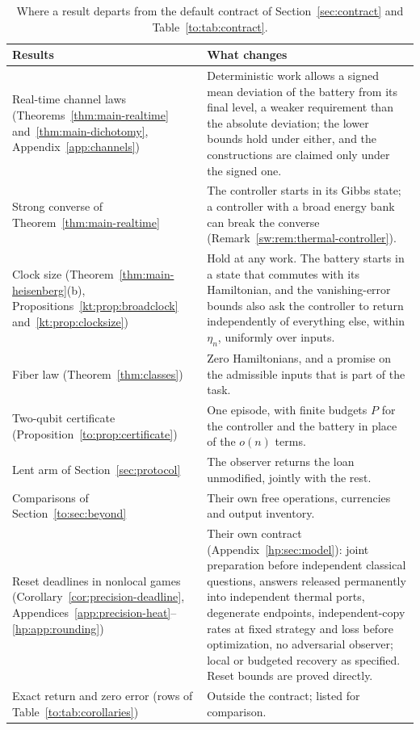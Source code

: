 \begin{table}[tbp]
\centering
\small
\begin{tabular}{@{}>{\raggedright\arraybackslash}p{4.6cm}>{\raggedright\arraybackslash}p{10.2cm}@{}}
\toprule
Results & What changes\\
\midrule
Real-time channel laws (Theorems~\ref{thm:main-realtime} and~\ref{thm:main-dichotomy}, Appendix~\ref{app:channels}) & Deterministic work allows a signed mean deviation of the battery from its final level, a weaker requirement than the absolute deviation; the lower bounds hold under either, and the constructions are claimed only under the signed one.\\
Strong converse of Theorem~\ref{thm:main-realtime} & The controller starts in its Gibbs state; a controller with a broad energy bank can break the converse (Remark~\ref{sw:rem:thermal-controller}).\\
Clock size (Theorem~\ref{thm:main-heisenberg}(b), Propositions~\ref{kt:prop:broadclock} and~\ref{kt:prop:clocksize}) & Hold at any work. The battery starts in a state that commutes with its Hamiltonian, and the vanishing-error bounds also ask the controller to return independently of everything else, within $\eta_n$, uniformly over inputs.\\
Fiber law (Theorem~\ref{thm:classes}) & Zero Hamiltonians, and a promise on the admissible inputs that is part of the task.\\
Two-qubit certificate (Proposition~\ref{to:prop:certificate}) & One episode, with finite budgets $P$ for the controller and the battery in place of the $o(n)$ terms.\\
Lent arm of Section~\ref{sec:protocol} & The observer returns the loan unmodified, jointly with the rest.\\
Comparisons of Section~\ref{to:sec:beyond} & Their own free operations, currencies and output inventory.\\
Reset deadlines in nonlocal games (Corollary~\ref{cor:precision-deadline}, Appendices~\ref{app:precision-heat}--\ref{hp:app:rounding}) & Their own contract (Appendix~\ref{hp:sec:model}): joint preparation before independent classical questions, answers released permanently into independent thermal ports, degenerate endpoints, independent-copy rates at fixed strategy and loss before optimization, no adversarial observer; local or budgeted recovery as specified. Reset bounds are proved directly.\\
Exact return and zero error (rows of Table~\ref{to:tab:corollaries}) & Outside the contract; listed for comparison.\\
\bottomrule
\end{tabular}
\caption{Where a result departs from the default contract of Section~\ref{sec:contract} and Table~\ref{to:tab:contract}.}\label{tab:exceptions}
\end{table}

